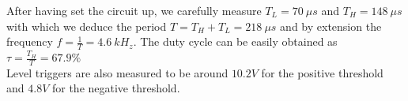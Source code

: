 \documentclass[11pt, openright]{book}
\begin{document}
After having set the circuit up, we carefully measure $T_L=70\ \mu s$ and $T_H=148\ \mu s$ with which we deduce the period $T=T_H+T_L=218\ \mu s$ and by extension the frequency $f=\frac{1}{T}=4.6\ kH_z$. The duty cycle can be easily obtained as $\tau=\frac{T_H}{T}=67.9\%$\\
Level triggers are also measured to be around $10.2V$ for the positive threshold and $4.8V$ for the negative threshold.

\begin{figure}[ht]
    \begin{floatrow}
        
        
    \end{floatrow}
\end{figure}
\end{document}
